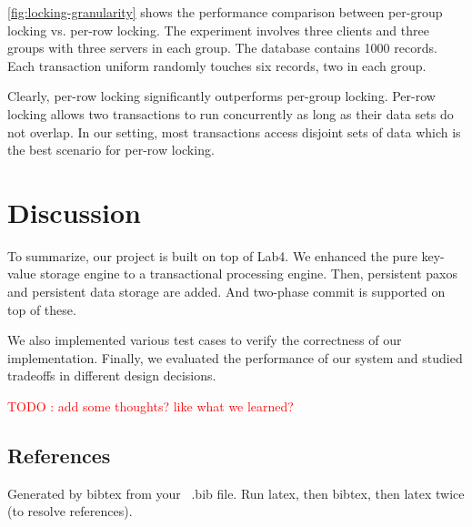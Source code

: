 \documentclass{vldb}
\begin{document}
\cref{fig:locking-granularity} shows the performance comparison 
between per-group locking vs. per-row locking. The experiment involves 
three clients and three groups with three servers in each group. The 
database contains 1000 records. Each transaction uniform randomly 
touches six records, two in each group. 

Clearly, per-row locking significantly outperforms per-group locking.  
Per-row locking allows two transactions to run concurrently as long as 
their data sets do not overlap. In our setting, most transactions 
access disjoint sets of data which is the best scenario for per-row 
locking. 

\section{Discussion}

To summarize, our project is built on top of Lab4. We enhanced the 
pure key-value storage engine to a transactional processing engine.
Then, persistent paxos and persistent data storage are added. And 
two-phase commit is supported on top of these. 

We also implemented various test cases to verify the correctness of 
our implementation. Finally, we evaluated the performance of our 
system and studied tradeoffs in different design decisions.

\textcolor{red}{TODO : add some thoughts? like what we learned?}



\subsection{References}
Generated by bibtex from your ~.bib file.  Run latex,
then bibtex, then latex twice (to resolve references).
\end{document}
